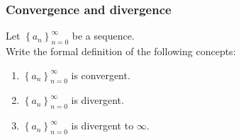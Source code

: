 \documentclass[14pt]{beamer}
\newcommand{\an}{\left\{ a_n \right\}_{n=0}^{\infty}}
\begin{document}
	\begin{frame}[t]
		\frametitle{Convergence and divergence}

		Let ${\displaystyle \an}$ be a sequence. \\ Write the formal definition of the
		following concepts:

		\begin{enumerate}
			\item ${\displaystyle \an}$ is convergent.

				\vfill

			\item ${\displaystyle \an}$ is divergent.

				\vfill

			\item ${\displaystyle \an}$ is divergent to $\infty$.

				\vfill
		\end{enumerate}
	\end{frame}
\end{document}
